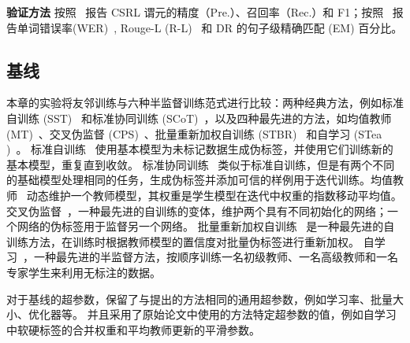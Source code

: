\noindent\textbf{验证方法 } 按照~\citet{wu2021csagn} 报告 CSRL 谓元的精度（Pre.）、召回率（Rec.）和 F1；按照~\citet{hao2021rast} 报告单词错误率(WER)~\cite{morris2004and}, Rouge-L (R-L)~\cite{lin2004rouge} 和 DR 的句子级精确匹配 (EM) 百分比。

\subsection{基线}\label{sec:baseline}
本章的实验将友邻训练与六种半监督训练范式进行比较：两种经典方法，例如标准自训练 (SST)~\cite{scudder1965probability} 和标准协同训练 (SCoT)~\cite{blum1998combining}，以及四种最先进的方法，如均值教师 (MT)~\cite{tarvainen2017mean}、交叉伪监督 (CPS)~\cite{chen2021semi}、批量重新加权自训练 (STBR)~\cite{bhat2021self} 和自学习 (STea )~\cite{yu2021self}。 标准自训练~\cite{scudder1965probability} 使用基本模型为未标记数据生成伪标签，并使用它们训练新的基本模型，重复直到收敛。 标准协同训练~\cite{blum1998combining} 类似于标准自训练，但是有两个不同的基础模型处理相同的任务，生成伪标签并添加可信的样例用于迭代训练。均值教师~\cite{tarvainen2017mean} 动态维护一个教师模型，其权重是学生模型在迭代中权重的指数移动平均值。 交叉伪监督~\cite{chen2021semi}，一种最先进的自训练的变体，维护两个具有不同初始化的网络；一个网络的伪标签用于监督另一个网络。 批量重新加权自训练~\cite{bhat2021self} 是一种最先进的自训练方法，在训练时根据教师模型的置信度对批量伪标签进行重新加权。 自学习~\cite{yu2021self}，一种最先进的半监督方法，按顺序训练一名初级教师、一名高级教师和一名专家学生来利用无标注的数据。

对于基线的超参数，保留了与提出的方法相同的通用超参数，例如学习率、批量大小、优化器等。 并且采用了原始论文中使用的方法特定超参数的值，例如自学习中软硬标签的合并权重和平均教师更新的平滑参数。

